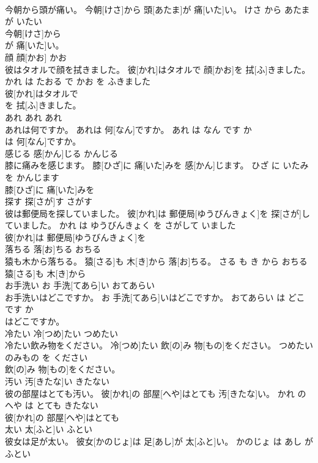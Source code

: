 \documentclass[8pt]{extreport}
\begin{document}
\begin{CJK}{UTF8}{min}
\\	今朝から頭が痛い。	今朝[けさ]から 頭[あたま]が 痛[いた]い。	けさ から あたま が いたい	
\\	今朝[けさ]から
\\	が 痛[いた]い。			
\\	顔	顔[かお]	かお	
\\	彼はタオルで顔を拭きました。	彼[かれ]はタオルで 顔[かお]を 拭[ふ]きました。	かれ は たおる で かお を ふきました	
\\	彼[かれ]はタオルで
\\	を 拭[ふ]きました。			
\\	あれ	あれ	あれ	
\\	あれは何ですか。	あれは 何[なん]ですか。	あれ は なん です か	
\\	は 何[なん]ですか。			
\\	感じる	感[かん]じる	かんじる	
\\	膝に痛みを感じます。	膝[ひざ]に 痛[いた]みを 感[かん]じます。	ひざ に いたみ を かんじます	
\\	膝[ひざ]に 痛[いた]みを
\\	探す	探[さが]す	さがす	
\\	彼は郵便局を探していました。	彼[かれ]は 郵便局[ゆうびんきょく]を 探[さが]していました。	かれ は ゆうびんきょく を さがして いました	
\\	彼[かれ]は 郵便局[ゆうびんきょく]を
\\	落ちる	落[お]ちる	おちる	
\\	猿も木から落ちる。	猿[さる]も 木[き]から 落[お]ちる。	さる も き から おちる	
\\	猿[さる]も 木[き]から
\\	お手洗い	お 手洗[てあら]い	おてあらい	
\\	お手洗いはどこですか。	お 手洗[てあら]いはどこですか。	おてあらい は どこ です か	
\\	はどこですか。			
\\	冷たい	冷[つめ]たい	つめたい	
\\	冷たい飲み物をください。	冷[つめ]たい 飲[の]み 物[もの]をください。	つめたい のみもの を ください	
\\	飲[の]み 物[もの]をください。			
\\	汚い	汚[きたな]い	きたない	
\\	彼の部屋はとても汚い。	彼[かれ]の 部屋[へや]はとても 汚[きたな]い。	かれ の へや は とても きたない	
\\	彼[かれ]の 部屋[へや]はとても
\\	太い	太[ふと]い	ふとい	
\\	彼女は足が太い。	彼女[かのじょ]は 足[あし]が 太[ふと]い。	かのじょ は あし が ふとい	

\end{CJK}
\end{document}
